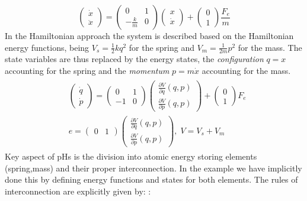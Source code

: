 \documentclass[a4paper,twoside, openright,12pt]{report}
\begin{document}
\begin{equation}
	\begin{pmatrix}\dot{x} \\ \ddot{x}\end{pmatrix} =
	\begin{pmatrix}0 & 1 \\ -\frac{k}{m} & 0\end{pmatrix}
	\begin{pmatrix}x \\ \dot{x}\end{pmatrix} + 
	\begin{pmatrix}0 \\ 1\end{pmatrix}\frac{F_e}{m}
\end{equation}
In the Hamiltonian approach the system is described based on the Hamiltonian energy functions, being $ V_s = \frac{1}{2}kq^2 $ for the spring and $ V_m = \frac{1}{2m}p^2 $ for the mass. The state variables are thus replaced by the energy states, the \emph{configuration} $q=x$ accounting for the spring and the \emph{momentum} $p=m\dot{x}$ accounting for the mass.  
\begin{eqnarray}\label{EQ:HSexample}
\begin{aligned}
	&\begin{pmatrix}\dot{q} \\ \dot{p}\end{pmatrix} =
	\begin{pmatrix}0 & 1 \\ -1 & 0\end{pmatrix}
	\begin{pmatrix}\frac{\partial V}{\partial q}(q,p) \\ \frac{\partial V}{\partial p}(q,p)\end{pmatrix} + 
	\begin{pmatrix}0 \\ 1\end{pmatrix} F_e\\
	&e = \begin{pmatrix}	0 & 1\end{pmatrix}\begin{pmatrix}\frac{\partial V}{\partial q}(q,p) \\ \frac{\partial V}{\partial p}(q,p)\end{pmatrix}, \; V=V_s+V_m
	\end{aligned}
\end{eqnarray}
Key aspect of pHs is the division into atomic energy storing elements (spring,mass) and their proper interconnection. In the example we have implicitly done this by defining energy functions and states for both elements. The rules of interconnection are explicitly given by: : 
\end{document}
